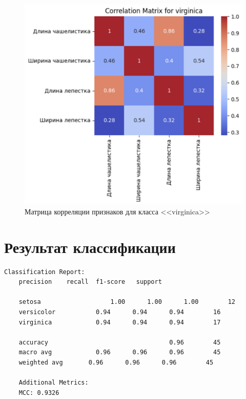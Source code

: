 \begin{figure}
	\begin{center}
		\includegraphics[width=\textwidth]{images/7.png}
	\end{center}
	\caption{Матрица корреляции признаков для класса <<virginica>>}
	\label{img:7}
\end{figure}

\section{Результат классификации}

\begin{lstlisting}[label=lst:2,caption=Отчёт по результатам классификации]
	Classification Report:
	precision    recall  f1-score   support
	
	setosa       			 1.00      1.00      1.00        12
	versicolor       	 0.94      0.94      0.94        16
	virginica       	 0.94      0.94      0.94        17
	
	accuracy                           		 0.96        45
	macro avg       	 0.96      0.96      0.96        45
	weighted avg       0.96      0.96      0.96        45
	
	Additional Metrics:
	MCC: 0.9326
\end{lstlisting}

